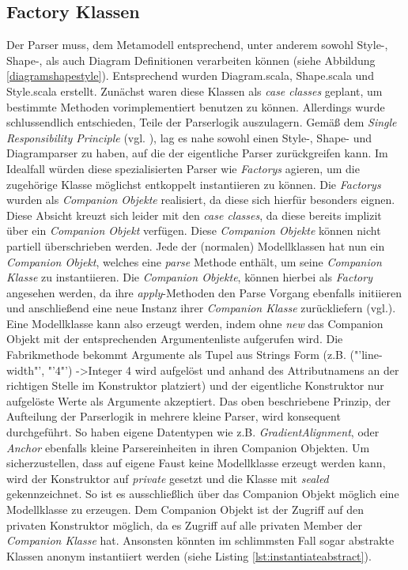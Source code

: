 \subsection{Factory Klassen}
Der Parser muss, dem Metamodell entsprechend, unter anderem sowohl Style-, Shape-, als auch Diagram Definitionen verarbeiten können (siehe Abbildung \ref{diagramshapestyle}). Entsprechend wurden Diagram.scala, Shape.scala und Style.scala erstellt. Zunächst waren diese Klassen als \textit{case classes} geplant, um bestimmte Methoden vorimplementiert benutzen zu können. Allerdings wurde schlussendlich entschieden, Teile der Parserlogik auszulagern. Gemäß dem \textit{Single Responsibility Principle} (vgl. ), lag es nahe sowohl einen Style-, Shape- und Diagramparser zu haben, auf die der eigentliche Parser zurückgreifen kann.
Im Idealfall würden diese spezialisierten Parser wie \textit{Factorys} agieren, um die zugehörige Klasse möglichst entkoppelt instantiieren zu können. Die \textit{Factorys} wurden als \textit{Companion Objekte} realisiert, da diese sich hierfür besonders eignen. Diese Absicht kreuzt sich leider mit den \textit{case classes}, da diese bereits implizit über ein \textit{Companion Objekt} verfügen. Diese \textit{Companion Objekte} können nicht partiell überschrieben werden.
Jede der (normalen) Modellklassen hat nun ein \textit{Companion Objekt}, welches eine \textit{parse} Methode enthält, um seine \textit{Companion Klasse} zu instantiieren.
Die \textit{Companion Objekte}, können hierbei als \textit{Factory} angesehen werden, da ihre \textit{apply}-Methoden den Parse Vorgang ebenfalls initiieren und anschließend eine neue Instanz ihrer \textit{Companion Klasse} zurückliefern (vgl.).
Eine Modellklasse kann also erzeugt werden, indem ohne \textit{new} das Companion Objekt mit der entsprechenden Argumentenliste aufgerufen wird.
Die Fabrikmethode bekommt Argumente als Tupel aus Strings Form (z.B. ("'line-width"', "'4"') -\textgreater  Integer 4 wird aufgelöst und anhand des Attributnamens an der richtigen Stelle im Konstruktor platziert) und der eigentliche Konstruktor nur aufgelöste Werte als Argumente akzeptiert.
Das oben beschriebene Prinzip, der Aufteilung der Parserlogik in mehrere kleine Parser, wird konsequent durchgeführt. So haben eigene Datentypen wie z.B. \textit{GradientAlignment}, oder \textit{Anchor} ebenfalls kleine Parsereinheiten in ihren Companion Objekten.
Um sicherzustellen, dass auf eigene Faust keine Modellklasse erzeugt werden kann, wird der Konstruktor auf \textit{private} gesetzt und die Klasse mit \textit{sealed} gekennzeichnet. So ist es ausschließlich über das Companion Objekt möglich eine Modellklasse zu erzeugen. Dem Companion Objekt ist der Zugriff auf den privaten Konstruktor möglich, da es Zugriff auf alle privaten Member der \textit{Companion Klasse} hat. Ansonsten könnten im schlimmsten Fall sogar abstrakte Klassen anonym instantiiert werden (siehe Listing \ref{lst:instantiateabstract}).\\\\\\

